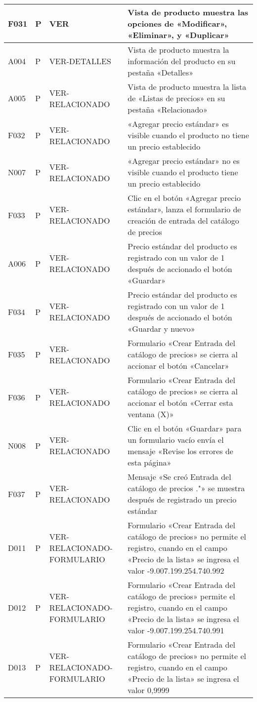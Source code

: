 \begin{landscape}
\begin{longtable}[htb]{|l|l|p{5.0cm}|p{13.0cm}|}
F031 & P & VER & Vista de producto muestra las opciones de «Modificar», «Eliminar», y «Duplicar» \\ \hline
A004 & P & VER-DETALLES & Vista de producto muestra la información del producto en su pestaña «Detalles» \\ \hline
A005 & P & VER-RELACIONADO & Vista de producto muestra la lista de «Listas de precios» en su pestaña «Relacionado» \\ \hline
F032 & P & VER-RELACIONADO & «Agregar precio estándar» es visible cuando el producto no tiene un precio establecido \\ \hline
N007 & P & VER-RELACIONADO & «Agregar precio estándar» no es visible cuando el producto tiene un precio establecido \\ \hline
F033 & P & VER-RELACIONADO & Clic en el botón «Agregar precio estándar», lanza el formulario de creación de entrada del catálogo de precios \\ \hline
A006 & P & VER-RELACIONADO & Precio estándar del producto es registrado con un valor de 1 después de accionado el botón «Guardar» \\ \hline
F034 & P & VER-RELACIONADO & Precio estándar del producto es registrado con un valor de 1 después de accionado el botón «Guardar y nuevo» \\ \hline
F035 & P & VER-RELACIONADO & Formulario «Crear Entrada del catálogo de precios» se cierra al accionar el botón «Cancelar» \\ \hline
F036 & P & VER-RELACIONADO & Formulario «Crear Entrada del catálogo de precios» se cierra al accionar el botón «Cerrar esta ventana (X)» \\ \hline
N008 & P & VER-RELACIONADO & Clic en el botón «Guardar» para un formulario vacío envía el mensaje «Revise los errores de esta página» \\ \hline
F037 & P & VER-RELACIONADO & Mensaje «Se creó Entrada del catálogo de precios ."» se muestra después de registrado un precio estándar \\ \hline
D011 & P & VER-RELACIONADO-FORMULARIO & Formulario «Crear Entrada del catálogo de precios» no permite el registro, cuando en el campo «Precio de la lista» se ingresa el valor -9.007.199.254.740.992 \\ \hline
D012 & P & VER-RELACIONADO-FORMULARIO & Formulario «Crear Entrada del catálogo de precios» permite el registro, cuando en el campo «Precio de la lista» se ingresa el valor -9.007.199.254.740.991 \\ \hline
D013 & P & VER-RELACIONADO-FORMULARIO & Formulario «Crear Entrada del catálogo de precios» no permite el registro, cuando en el campo «Precio de la lista» se ingresa el valor 0,9999 \\ \hline

\end{longtable}
\end{landscape}
